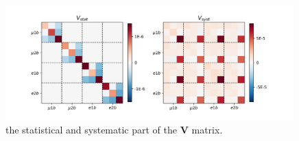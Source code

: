 \begin{figure}[ht]
    \centering
    \includegraphics[width=0.99\textwidth]{chapters/Analysis/sectionSystematics/figures/covarMatrix_total.png}
    \caption{ the statistical and systematic part of the $\textbf{V}$ matrix. }
    \label{fig:corBetaBar}
\end{figure}



\FloatBarrier









